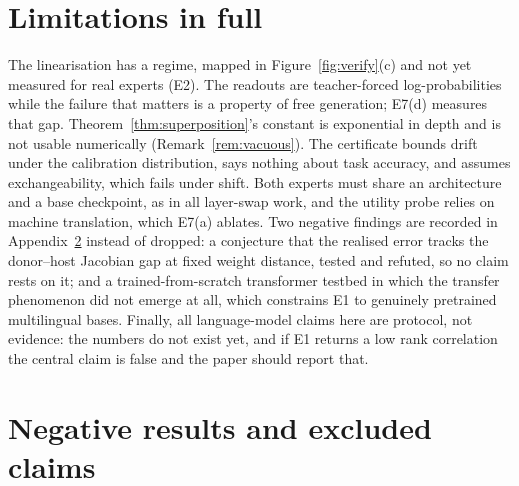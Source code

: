 \documentclass[10pt]{article}
\theoremstyle{plain}
\theoremstyle{definition}
\theoremstyle{remark}
\begin{document}
\section{Limitations in full}
\label{app:limits}

The linearisation has a regime, mapped in Figure~\ref{fig:verify}(c) and not yet
measured for real experts (E2). The readouts are teacher-forced
log-probabilities while the failure that matters is a property of free
generation; E7(d) measures that gap.
Theorem~\ref{thm:superposition}'s constant is exponential in depth and is not
usable numerically (Remark~\ref{rem:vacuous}). The certificate bounds drift under
the calibration distribution, says nothing about task accuracy, and assumes
exchangeability, which fails under shift. Both experts must share an architecture
and a base checkpoint, as in all layer-swap work, and the utility probe relies on
machine translation, which E7(a) ablates. Two negative findings are recorded in Appendix~\ref{app:negative} instead of
dropped: a conjecture that the realised error tracks the donor--host Jacobian gap
at fixed weight distance, tested and refuted, so no claim rests on it; and a
trained-from-scratch transformer testbed in which the transfer phenomenon did not
emerge at all, which constrains E1 to genuinely pretrained multilingual bases.
Finally, all language-model claims here are protocol, not evidence: the numbers
do not exist yet, and if E1 returns a low rank correlation the central claim is
false and the paper should report that.

\section{Negative results and excluded claims}
\label{app:negative}
\end{document}
